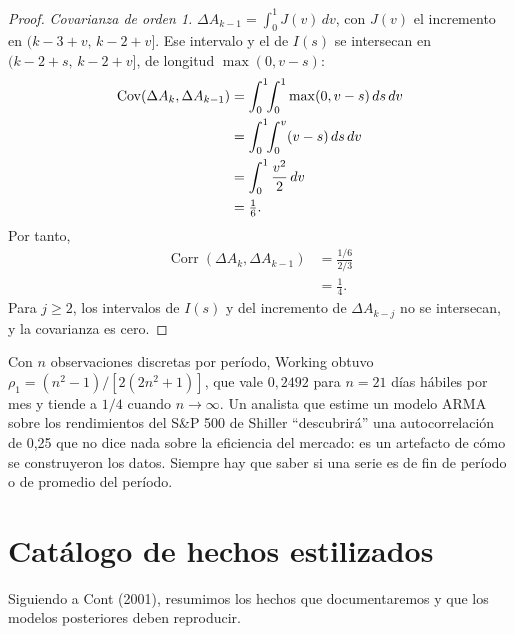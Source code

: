\begin{proof}
\emph{Covarianza de orden 1.} $\Delta A_{k-1}=\int_0^1J(v)\,dv$, con $J(v)$ el incremento en
$(k-3+v,\,k-2+v]$. Ese intervalo y el de $I(s)$ se intersecan en $(k-2+s,\,k-2+v]$, de longitud
$\max(0,v-s)$:
\begin{align*}
  \operatorname{Cov}(\Delta A_k,\Delta A_{k-1}) &= \int_0^1\!\!\int_0^1\max(0,v-s)\,ds\,dv\\
                                  &= \int_0^1\!\!\int_0^v(v-s)\,ds\,dv\\
                                  &= \int_0^1\frac{v^2}{2}\,dv\\
                                  &= \tfrac16 .
\end{align*}
Por tanto,
\begin{align*}
  \operatorname{Corr}(\Delta A_k,\Delta A_{k-1}) &= \frac{1/6}{2/3}\\
                                                 &= \frac14 .
\end{align*}
Para $j\ge2$, los intervalos de $I(s)$ y del incremento de $\Delta A_{k-j}$ no se intersecan, y la
covarianza es cero.
\end{proof}

\begin{observacion}
Con $n$ observaciones discretas por período, Working obtuvo
$\rho_1=(n^2-1)/[2(2n^2+1)]$, que vale $0{,}2492$ para $n=21$ días hábiles por mes y tiende a $1/4$
cuando $n\to\infty$. Un analista que estime un modelo ARMA sobre los rendimientos del S\&P 500 de Shiller
``descubrirá'' una autocorrelación de 0,25 que no dice nada sobre la eficiencia del mercado: es un
artefacto de cómo se construyeron los datos. Siempre hay que saber si una serie es de fin de período o
de promedio del período.
\end{observacion}

\section{Catálogo de hechos estilizados}

Siguiendo a Cont (2001), resumimos los hechos que documentaremos y que los modelos posteriores deben
reproducir.

